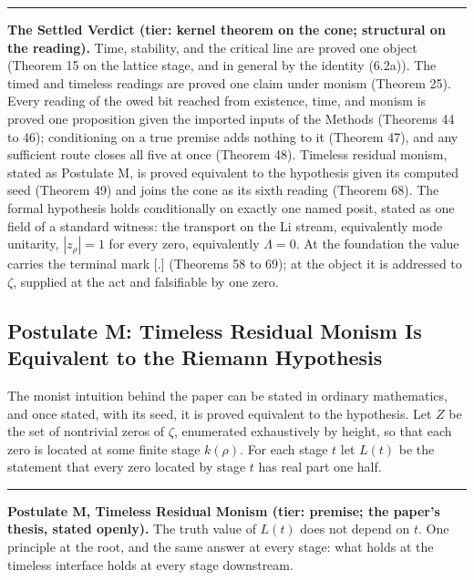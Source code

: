 \documentclass[10pt]{article}
\newcommand{\jboxstart}{\begin{jbox}}
\newcommand{\jboxend}{\end{jbox}}
\newenvironment{jbox}{\par\vspace{2pt}\noindent\color{accent}\rule{\columnwidth}{0.8pt}\par\vspace{-2pt}\small}{\par\vspace{2pt}}
\begin{document}
\jboxstart

\textbf{The Settled Verdict (tier: kernel theorem on the cone;
structural on the reading).} Time, stability, and the critical line are
proved one object (Theorem 15 on the lattice stage, and in general by
the identity (6.2a)). The timed and timeless readings are proved one
claim under monism (Theorem 25). Every reading of the owed bit reached
from existence, time, and monism is proved one proposition given the
imported inputs of the Methods (Theorems 44 to 46); conditioning on a
true premise adds nothing to it (Theorem 47), and any sufficient route
closes all five at once (Theorem 48). Timeless residual monism, stated
as Postulate M, is proved equivalent to the hypothesis given its
computed seed (Theorem 49) and joins the cone as its sixth reading
(Theorem 68). The formal hypothesis holds conditionally on exactly one
named posit, stated as one field of a standard witness: the transport on
the Li stream, equivalently mode unitarity, \(|z_\rho| = 1\) for every
zero, equivalently \(\Lambda = 0\). At the foundation the value carries
the terminal mark {[}.{]} (Theorems 58 to 69); at the object it is
addressed to \(\zeta\), supplied at the act and falsifiable by one zero.

\jboxend

\hypertarget{postulate-m-timeless-residual-monism-is-equivalent-to-the-riemann-hypothesis}{%
\subsection{Postulate M: Timeless Residual Monism Is Equivalent to the
Riemann
Hypothesis}\label{postulate-m-timeless-residual-monism-is-equivalent-to-the-riemann-hypothesis}}

The monist intuition behind the paper can be stated in ordinary
mathematics, and once stated, with its seed, it is proved equivalent to
the hypothesis. Let \(Z\) be the set of nontrivial zeros of \(\zeta\),
enumerated exhaustively by height, so that each zero is located at some
finite stage \(k(\rho)\). For each stage \(t\) let \(L(t)\) be the
statement that every zero located by stage \(t\) has real part one half.

\jboxstart

\textbf{Postulate M, Timeless Residual Monism (tier: premise; the
paper's thesis, stated openly).} The truth value of \(L(t)\) does not
depend on \(t\). One principle at the root, and the same answer at every
stage: what holds at the timeless interface holds at every stage
downstream.
\end{document}
